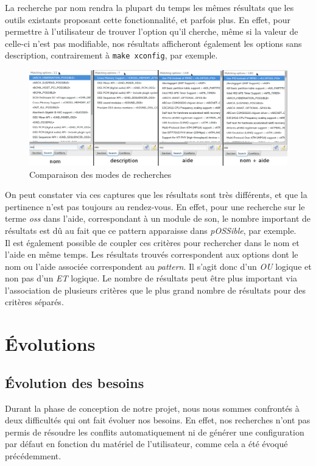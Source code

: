 \documentclass[17pts]{report}
\begin{document}
La recherche par nom rendra la plupart du temps les mêmes résultats que les
outils existants proposant cette fonctionnalité, et parfois plus. En effet,
pour permettre à l'utilisateur de trouver l'option qu'il cherche, même si la
valeur de celle-ci n'est pas modifiable, nos résultats afficheront également
les options sans description, contrairement à \verb|make xconfig|, par
exemple.\\

\begin{figure}[H]
    \includegraphics[scale=0.4]{./illustrations/search_cmp.png}
    \centering
    \caption{Comparaison des modes de recherches}
    \label{fig:ModesDeRecherche}
\end{figure}

On peut constater via ces captures que les résultats sont très différents, et
que la pertinence n'est pas toujours au rendez-vous. En effet, pour une
recherche sur le terme \textit{oss} dans l'aide, correspondant à un module de
son, le nombre important de résultats est dû au fait que ce pattern apparaisse
dans \textit{pOSSible}, par exemple.\\

Il est également possible de coupler ces critères pour rechercher dans le nom
et l'aide en même temps. Les résultats trouvés correspondent aux options dont
le nom ou l'aide associée correspondent au \textit{pattern}. Il s'agit donc d'un
\textit{OU} logique et non pas d'un \textit{ET} logique. Le nombre de résultats
peut être plus important via l'association de plusieurs critères que le plus
grand nombre de résultats pour des critères séparés.\\

\section{Évolutions}
\label{sec:Évolutions}
\subsection{Évolution des besoins}
\label{sub:Évolution des besoins}
Durant la phase de conception de notre projet, nous nous sommes confrontés à
deux difficultés qui ont fait évoluer nos besoins. En effet, nos recherches
n'ont pas permis de résoudre les conflits automatiquement ni de générer une
configuration par défaut en fonction du matériel de l'utilisateur, comme cela a
été évoqué précédemment.  \\
\end{document}

